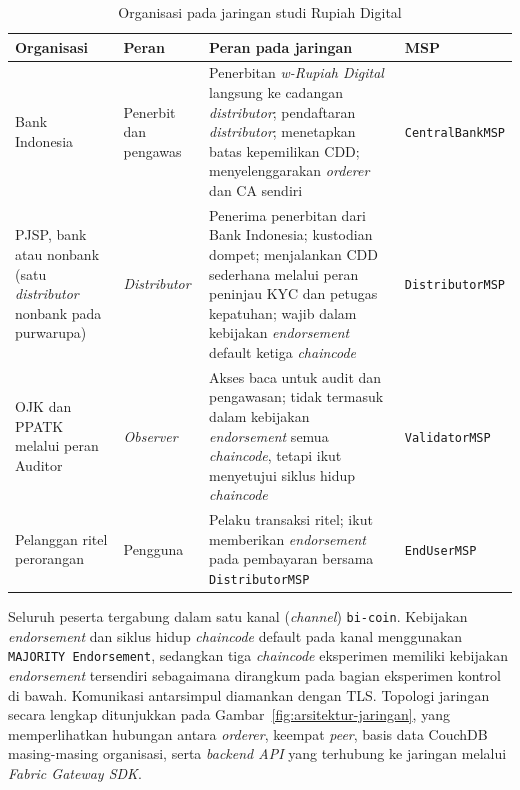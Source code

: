 \begingroup
\renewcommand{\arraystretch}{1.3}
\begin{table}[H]
	\caption{Organisasi pada jaringan studi Rupiah Digital}
	\label{tab:jaringan}
	\centering
	\small
	\begin{tabular}{p{2.9cm} p{2.7cm} p{3.4cm} p{3.4cm}}
	\toprule
	\textbf{Organisasi} & \textbf{Peran} & \textbf{Peran pada jaringan} & \textbf{MSP} \\
	\midrule
	Bank Indonesia & Penerbit dan pengawas & Penerbitan \textit{w-Rupiah Digital} langsung ke cadangan \textit{distributor}; pendaftaran \textit{distributor}; menetapkan batas kepemilikan CDD; menyelenggarakan \textit{orderer} dan CA sendiri & \texttt{CentralBankMSP} \\
	PJSP, bank atau nonbank (satu \textit{distributor} nonbank pada purwarupa) & \textit{Distributor} & Penerima penerbitan dari Bank Indonesia; kustodian dompet; menjalankan CDD sederhana melalui peran peninjau KYC dan petugas kepatuhan; wajib dalam kebijakan \textit{endorsement} default ketiga \textit{chaincode} & \texttt{DistributorMSP} \\
	OJK dan PPATK melalui peran Auditor & \textit{Observer} & Akses baca untuk audit dan pengawasan; tidak termasuk dalam kebijakan \textit{endorsement} semua \textit{chaincode}, tetapi ikut menyetujui siklus hidup \textit{chaincode} & \texttt{ValidatorMSP} \\
	Pelanggan ritel perorangan & Pengguna & Pelaku transaksi ritel; ikut memberikan \textit{endorsement} pada pembayaran bersama \texttt{DistributorMSP} & \texttt{EndUserMSP} \\
	\bottomrule
	\end{tabular}
\end{table}
\endgroup

Seluruh peserta tergabung dalam satu kanal (\textit{channel}) \texttt{bi-coin}.
Kebijakan \textit{endorsement} dan siklus hidup \textit{chaincode} default pada
kanal menggunakan \texttt{MAJORITY Endorsement}, sedangkan tiga \textit{chaincode}
eksperimen memiliki kebijakan \textit{endorsement} tersendiri sebagaimana
dirangkum pada bagian eksperimen kontrol di bawah.
Komunikasi antarsimpul diamankan dengan TLS.
Topologi jaringan secara lengkap ditunjukkan pada
Gambar~\ref{fig:arsitektur-jaringan}, yang memperlihatkan hubungan antara
\textit{orderer}, keempat \textit{peer}, basis data CouchDB masing-masing
organisasi, serta \textit{backend API} yang terhubung ke jaringan melalui
\textit{Fabric Gateway SDK}.




